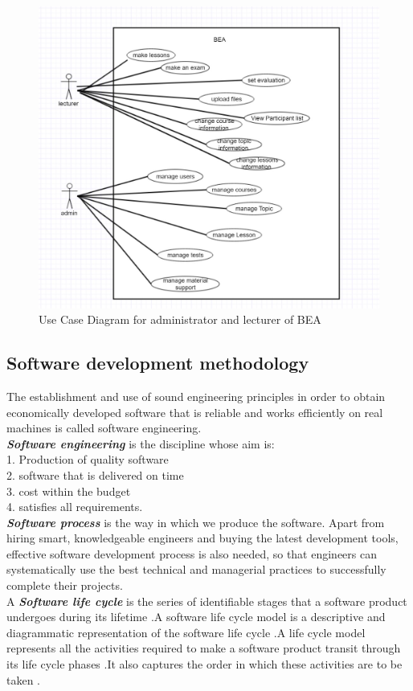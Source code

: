\documentclass{scrartcl}
\begin{document}
\begin{figure}[H]
\centering
\includegraphics[width=150mm]{ucd_admin_lecturer.JPG}
\caption{Use Case Diagram for administrator and lecturer of BEA}
\label{ucd_user}
\end{figure}

  	\subsection{Software development methodology}
  	The establishment and use of sound engineering principles in order to obtain economically
developed software that is reliable and works efficiently on real machines is called software engineering.\\
\textbf{\textit{ Software engineering}} is the discipline whose aim is:\\
1. Production of quality software\\
2. software that is delivered on time\\
3. cost within the budget\\
4. satisfies all requirements.\\
\textbf{\textit{ Software process}} is the way in which we produce the software. Apart from hiring smart,
knowledgeable engineers and buying the latest development tools, effective software
development process is also needed, so that engineers can systematically use the best technical
and managerial practices to successfully complete their projects.\\
A \textbf{\textit{ Software life cycle}} is the series of identifiable stages that a software product undergoes during
its lifetime .A software life cycle model is a descriptive and diagrammatic representation of the
software life cycle .A life cycle model represents all the activities required to make a software
product transit through its life cycle phases .It also captures the order in which these activities are
to be taken .\\
\end{document}
